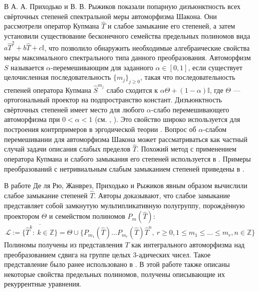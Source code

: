 \documentclass[14pt, a4paper, russian]{report}
\begin{document}
В \cite{convolutions} А. А. Приходько и В. В. Рыжиков показали попарную дизъюнктность всех свёрточных степеней спектральной меры автоморфизма Шакона. Они рассмотрели оператор Купмана $\hat{T}$ и слабое замыкание его степеней, а затем установили существование бесконечного семейства предельных полиномов вида $a\hat{T}^2 + b\hat{T} + c\mathbb{I}$, что позволило обнаружить необходимые алгебраические свойства меры максимального спектрального типа данного преобразования.
Автоморфизм $S$ называется $\alpha$-перемешивающим для заданного $\alpha \in [0,1]$, если существует целочисленная последовательность $\{m_j\}_{j \ge 0}$, такая что последовательность степеней оператора Купмана $\hat{S}^{m_j}$ слабо сходится к $\alpha \Theta + (1-\alpha) \mathbb{I}$, где $\Theta$ --- ортогональный проектор на подпространство констант. 
Дизъюнктность свёрточных степеней имеет место для любого $\alpha$-слабо перемешивающего автоморфизма при $0 < \alpha < 1$ (см. \cite{katok}, \cite{stepin}). Это свойство широко используется для построения контрпримеров в эргодической теории \cite{deljunco1992}. Вопрос об $\alpha$-слабом перемешивании для автоморфизма Шакона может рассматриваться как частный случай задачи описания слабых пределов $\hat{T}$. Похожий метод с применением оператора Купмана и слабого замыкания его степеней используется в \cite{delarue2012}. Примеры преобразований с нетривиальным слабым замыканием степеней приведены в \cite{ryzhikov}.

В работе \cite{weaklimits} Де ля Рю, Жанврез, Приходько и Рыжиков явным образом вычислили слабое замыкание степеней $\hat{T}$. Авторы доказывают, что слабое замыкание представляет собой замкнутую мультипликативную полугруппу, порождённую проектором $\Theta$ и семейством полиномов $P_m(\hat{T})$:
$$\mathcal{L} := \overline{\{\hat{T}^k:\ k \in \mathbb{Z}\}} = \Theta \cup \{P_{m_1}(\hat{T}) \ldots P_{m_r}(\hat{T})\hat{T}^n,\ r \ge 0, 1 \le m_1 \le \ldots \le m_r, n \in \mathbb{Z}\}$$
Полиномы получены из представления $T$ как интегрального автоморфизма над преобразованием сдвига на группе целых $3$-адических чисел. Такое представление было ранее использовано в \cite{convolutions}. В этой работе также описаны некоторые свойства предельных полиномов, получены описывающие их рекуррентные уравнения.
\end{document}
